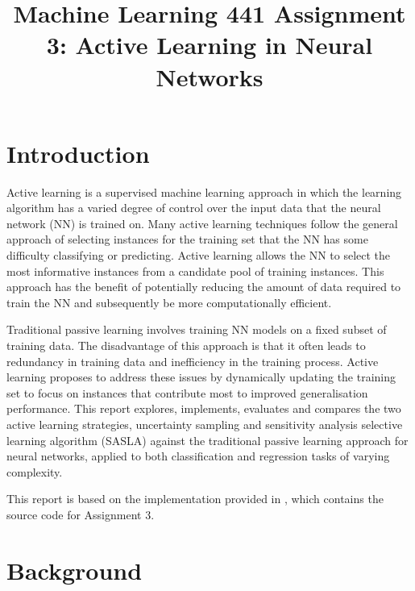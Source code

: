 \documentclass[conference]{IEEEtran}
\begin{document}
	
	\title{Machine Learning 441 Assignment 3: Active Learning in Neural Networks}
	\author{
	}
	\maketitle
	
	\begin{abstract}
	
	\end{abstract}
	
	\section{Introduction}
	Active learning is a supervised machine learning approach in which the learning algorithm has a varied degree of control over the input data that the neural network (NN) is trained on. Many active learning techniques follow the general approach of selecting instances for the training set that the NN has some difficulty classifying or predicting. Active learning allows the NN to select the most informative instances from a candidate pool of training instances. This approach has the benefit of potentially reducing the amount of data required to train the NN and subsequently be more computationally efficient.
	
	Traditional passive learning involves training NN models on a fixed subset of training data. The disadvantage of this approach is that it often leads to redundancy in training data and inefficiency in the training process. Active learning proposes to address these issues by dynamically updating the training set to focus on instances that contribute most to improved generalisation performance. This report explores, implements, evaluates and compares the two active learning strategies, uncertainty sampling and sensitivity analysis selective learning algorithm (SASLA) against the traditional passive learning approach for neural networks, applied to both classification and regression tasks of varying complexity.

	This report is based on the implementation provided in \cite{github}, which contains the source code for Assignment 3.

	\section{Background}\label{B}
\end{document}
